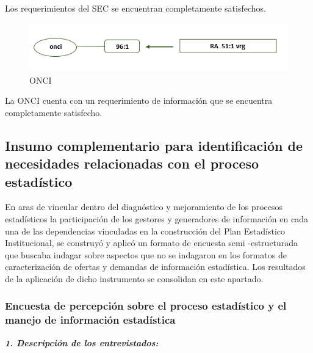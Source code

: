 \documentclass[
]{book}
\begin{document}
Los requerimientos del SEC se encuentran completamente satisfechos.

\begin{figure}

{\centering \includegraphics[width=0.75\linewidth]{Imagenes/ima18} 

}

\caption{ONCI}\label{fig:unnamed-chunk-46}
\end{figure}

La ONCI cuenta con un requerimiento de información que se encuentra completamente
satisfecho.

\hypertarget{insumo-complementario-para-identificaciuxf3n-de-necesidades-relacionadas-con-el-proceso-estaduxedstico}{%
\subsection{Insumo complementario para identificación de necesidades relacionadas con el proceso estadístico}\label{insumo-complementario-para-identificaciuxf3n-de-necesidades-relacionadas-con-el-proceso-estaduxedstico}}

En aras de vincular dentro del diagnóstico y mejoramiento de los procesos estadísticos la
participación de los gestores y generadores de información en cada una de las dependencias
vinculadas en la construcción del Plan Estadístico Institucional, se construyó y aplicó un formato
de encuesta semi -estructurada que buscaba indagar sobre aspectos que no se indagaron en los
formatos de caracterización de ofertas y demandas de información estadística. Los resultados de
la aplicación de dicho instrumento se consolidan en este apartado.

\hypertarget{encuesta-de-percepciuxf3n-sobre-el-proceso-estaduxedstico-y-el-manejo-de-informaciuxf3n-estaduxedstica}{%
\subsubsection{Encuesta de percepción sobre el proceso estadístico y el manejo de información estadística}\label{encuesta-de-percepciuxf3n-sobre-el-proceso-estaduxedstico-y-el-manejo-de-informaciuxf3n-estaduxedstica}}

\textbf{\emph{1. Descripción de los entrevistados:}}
\end{document}
